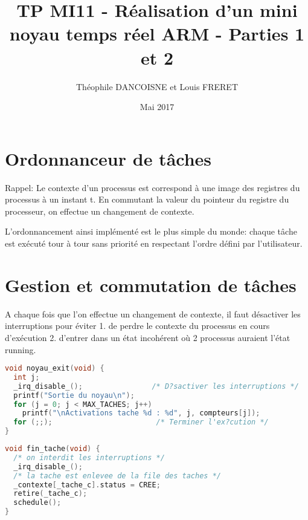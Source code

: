 \documentclass{article}
\title{TP MI11 - Réalisation d’un mini noyau temps réel ARM - Parties 1 et 2}
\author{Théophile DANCOISNE et Louis FRERET}
\date{Mai 2017}
\begin{document}
\maketitle

\section{Ordonnanceur de tâches}
Rappel: Le contexte d'un processus est correspond à une image des registres du processus à un instant t. En commutant la valeur du pointeur du registre du processeur, on effectue un changement de contexte.


L'ordonnancement ainsi implémenté est le plus simple du monde: chaque tâche est exécuté tour à tour sans priorité en respectant l'ordre défini par l'utilisateur.



\section{Gestion et commutation de tâches}
A chaque fois que l'on effectue un changement de contexte, il faut désactiver les interruptions pour éviter 1. de perdre le contexte du processus en cours d'exécution 2. d'entrer dans un état incohérent où 2 processus auraient l'état running.

\begin{lstlisting}[language=C, caption=noyau.c]
void noyau_exit(void) {
  int j;
  _irq_disable_();                /* D?sactiver les interruptions */
  printf("Sortie du noyau\n");
  for (j = 0; j < MAX_TACHES; j++)
    printf("\nActivations tache %d : %d", j, compteurs[j]);
  for (;;);                        /* Terminer l'ex?cution */
}
\end{lstlisting}

\begin{lstlisting}[language=C, caption=noyau.c]
void fin_tache(void) {
  /* on interdit les interruptions */
  _irq_disable_();
  /* la tache est enlevee de la file des taches */
  _contexte[_tache_c].status = CREE;
  retire(_tache_c);
  schedule();
}
\end{lstlisting}

\begin{lstlisting}[language=C, caption=noyau.c]
\end{lstlisting}

\begin{lstlisting}[language=C, caption=noyau.c]
\end{lstlisting}

\begin{lstlisting}[language=C, caption=noyau.c]
\end{lstlisting}
\end{document}
